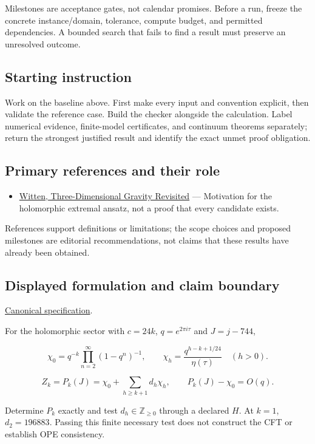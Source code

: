 \documentclass[
  11pt,
]{article}
\providecommand{\tightlist}{%
  \setlength{\itemsep}{0pt}\setlength{\parskip}{0pt}}
\begin{document}
Milestones are acceptance gates, not calendar promises. Before a run,
freeze the concrete instance/domain, tolerance, compute budget, and
permitted dependencies. A bounded search that fails to find a result
must preserve an unresolved outcome.

\subsection{Starting instruction}

Work on the baseline above. First make every input and convention
explicit, then validate the reference case. Build the checker alongside
the calculation. Label numerical evidence, finite-model certificates,
and continuum theorems separately; return the strongest justified result
and identify the exact unmet proof obligation.

\subsection{Primary references and their role}

\begin{itemize}
\tightlist
\item
  \href{https://arxiv.org/abs/0706.3359}{Witten, Three-Dimensional
  Gravity Revisited} --- Motivation for the holomorphic extremal ansatz,
  not a proof that every candidate exists.
\end{itemize}

References support definitions or limitations; the scope choices and
proposed milestones are editorial recommendations, not claims that these
results have already been obtained.

\subsection{Displayed formulation and claim boundary}

\href{https://github.com/rick-stevens-ai/Pure-Thought/blob/main/PRDs/01-AdS3-Modular-Bootstrap.md}{Canonical
specification}.

For the holomorphic sector with \(c=24k\), \(q=e^{2\pi i\tau}\) and
\(J=j-744\),

\[\chi_0=q^{-k}\prod_{n=2}^{\infty}(1-q^n)^{-1},\qquad
\chi_h=\frac{q^{h-k+1/24}}{\eta(\tau)}\quad(h>0).\]

\[Z_k=P_k(J)=\chi_0+\sum_{h\ge k+1}d_h\chi_h,\qquad
P_k(J)-\chi_0=O(q).\]

Determine \(P_k\) exactly and test \(d_h\in\mathbb Z_{\ge0}\) through a
declared \(H\). At \(k=1\), \(d_2=196883\). Passing this finite
necessary test does not construct the CFT or establish OPE consistency.
\end{document}
